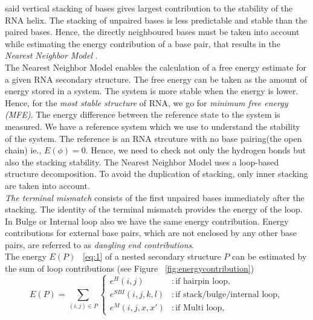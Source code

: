\documentclass[twoside,a4paper]{report}
\begin{document}
 	 \citet{DeVoe1962TheSO} said vertical stacking of bases gives largest contribution to the stability of the RNA helix. The stacking of unpaired bases is less predictable and stable than the paired bases. Hence, the directly neighboured bases must be taken into account while estimating the energy contribution of a  base pair, that results in the \textit{Nearest Neighbor Model} \citep{borer1974stability}.\\
 	 
 	 The Nearest Neighbor Model enables the calculation of a free energy estimate for a given RNA secondary structure. The free energy can be taken as the amount of energy stored in a system. The system is more stable when the energy is lower. Hence, for the \textit{most stable structure} of RNA, we go for \textit{minimum free energy (MFE)}. The energy difference between the reference state to the system is measured. We have a reference system which we use to understand the stability of the system. The reference is an RNA strcuture with no base pairing(the open chain) ie., $ E(\phi) =0 $. Hence, we need to check not only the hydrogen bonds but also the stacking stability. The Nearest Neighbor Model uses a loop-based structure decomposition. To avoid the duplication of stacking, only inner stacking are taken into account. \\
 	 
 	 \textit{The terminal mismatch} consists of the first unpaired bases immediately after the stacking. The identity of the terminal mismatch provides the energy of the loop. In Bulge or Internal loop also we have the same energy contribution. Energy contributions for external base pairs, which are not enclosed by any other base pairs, are referred to as \textit{dangling end contributions}.\\ 
 	 The energy $E(P)$ ~\ref{eq:1} of a nested secondary structure $P$ can be estimated by the sum of loop contributions (see Figure ~\ref{fig:energycontribution})\\
 	 
 	 \begin{equation}
 	 \label{eq:1}
 	 E(P) = \sum_{(i,j) \in P} \begin{cases}
 	 e^H(i,j) & : \text{if hairpin loop}, \\
 	 e^{SBI}(i,j,k,l) & : \text{if stack/bulge/internal loop} ,\\
 	 e^M(i,j,x,x') & : \text{if Multi loop},
 	 \end{cases}
 	 \end{equation}
 	 
\end{document}
